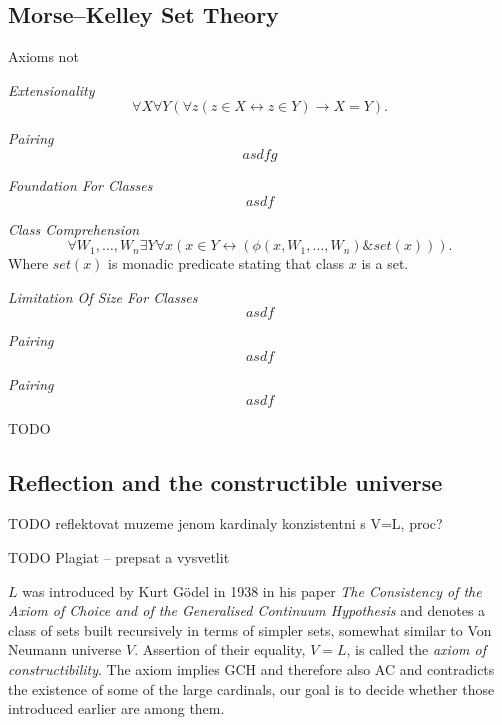 \documentclass[12pt,a4paper]{article}
\renewcommand{\iff}{\leftrightarrow}
\newcommand{\then}{\rightarrow}
\newcommand{\bce}{\begin{compactenum}}
\newcommand{\ece}{\end{compactenum}}
\begin{document}
\newpage
\subsection{Morse–Kelley Set Theory}
Axioms not 
\bce[(i)]
\item \emph{Extensionality}
\begin{equation}
\forall X \forall Y (\forall z ( z \in X \iff z \in Y) \then X = Y).
\end{equation}
\item \emph{Pairing}
\begin{equation}
asdfg
\end{equation}
\item \emph{Foundation For Classes}
\begin{equation}
asdf
\end{equation}
\item \emph{Class Comprehension}
\begin{equation}
\forall W_1, \ldots, W_n \exists Y \forall x (x \in Y \iff (\phi (x, W_1, \ldots, W_n) \& set(x))).
\end{equation}
Where $set(x)$ is monadic predicate stating that class $x$ is a set.
\item \emph{Limitation Of Size For Classes}
\begin{equation}
asdf
\end{equation}
\item \emph{Pairing}
\begin{equation}
asdf
\end{equation}
\item \emph{Pairing}
\begin{equation}
asdf
\end{equation}
\ece
TODO


\newpage

\subsection{Reflection and the constructible universe}


TODO reflektovat muzeme jenom kardinaly konzistentni s V=L, proc?

TODO Plagiat -- prepsat a vysvetlit

$L$ was introduced by Kurt Gödel in 1938 in his paper \emph{The Consistency of the Axiom of Choice and of the Generalised Continuum Hypothesis} and denotes a class of sets built recursively in terms of simpler sets, somewhat similar to Von Neumann universe $V$. Assertion of their equality, $V=L$, is called the \emph{axiom of constructibility}. The axiom implies GCH and therefore also AC and contradicts the existence of some of the large cardinals, our goal is to decide whether those introduced earlier are among them.
\end{document}
